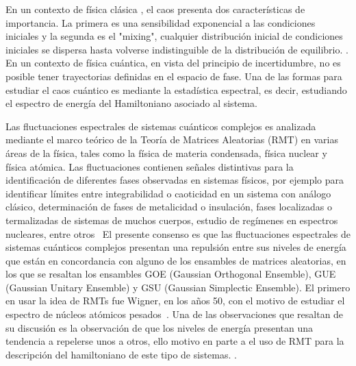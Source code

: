 \documentclass[spanish,titlepage,table]{practicas}
\begin{document}
En un contexto de física clásica , el caos presenta dos características de importancia. 
La primera es una sensibilidad exponencial a las condiciones iniciales y la segunda es el "mixing", cualquier distribución inicial de condiciones iniciales se dispersa hasta volverse indistinguible de la distribución de equilibrio. . En un contexto de física cuántica, en vista del principio de incertidumbre, no es posible tener 
trayectorias definidas en el espacio de fase. Una de las formas para estudiar el caos cuántico es mediante la estadística espectral, es decir, estudiando el espectro de energía del Hamiltoniano asociado al sistema.

Las fluctuaciones espectrales de sistemas cuánticos complejos es analizada mediante 
el marco teórico de la Teoría de Matrices Aleatorias (RMT) en varias áreas de la física, 
tales como la física de materia condensada, física nuclear y física atómica.
Las fluctuaciones contienen señales distintivas para la identificación de diferentes fases observadas 
en sistemas físicos, por ejemplo para identificar límites entre integrabilidad o caoticidad en un sistema con análogo clásico,
determinación de fases de metalicidad o insulación, fases localizadas o termalizadas de sistemas de muchos cuerpos, estudio de regímenes en espectros nucleares, entre otros~\cite{Tekur2020}
El presente consenso es que las fluctuaciones espectrales de sistemas cuánticos complejos presentan 
una repulsión entre sus niveles de energía que están en concordancia con alguno de los ensambles de matrices 
aleatorias, en los que se resaltan los ensambles GOE (Gaussian Orthogonal Ensemble), GUE (Gaussian Unitary Ensemble) y GSU (Gaussian Simplectic Ensemble).
El primero en usar la idea de RMTs fue Wigner, en los años 50, con el motivo de estudiar el espectro de núcleos atómicos pesados~\cite{Wigner1955}.
Una de las observaciones que resaltan de su discusión es la observación de que los niveles de energía presentan una tendencia a repelerse unos a otros, 
ello motivo en parte a el uso de RMT para la descripción del hamiltoniano de este tipo de sistemas. .
\end{document}
